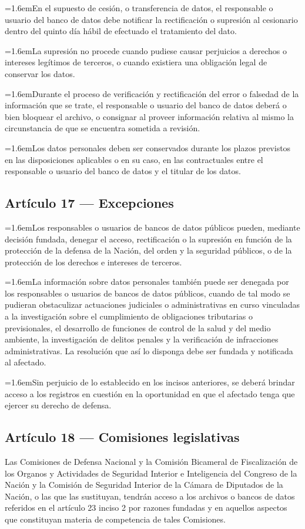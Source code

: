 \documentclass[10pt,a4paper]{article}
\newcommand{\articulo}[1]{\subsection{#1}}
\newcommand{\inciso}[2]{\par{\hangindent=1.6em\hangafter=1\makebox[1.6em][l]{#1}#2\par}}
\begin{document}
\inciso{4.}{En el supuesto de cesión, o transferencia de datos, el responsable o usuario del banco de datos debe notificar la rectificación o supresión al cesionario dentro del quinto día hábil de efectuado el tratamiento del dato.}

\inciso{5.}{La supresión no procede cuando pudiese causar perjuicios a derechos o intereses legítimos de terceros, o cuando existiera una obligación legal de conservar los datos.}

\inciso{6.}{Durante el proceso de verificación y rectificación del error o falsedad de la información que se trate, el responsable o usuario del banco de datos deberá o bien bloquear el archivo, o consignar al proveer información relativa al mismo la circunstancia de que se encuentra sometida a revisión.}

\inciso{7.}{Los datos personales deben ser conservados durante los plazos previstos en las disposiciones aplicables o en su caso, en las contractuales entre el responsable o usuario del banco de datos y el titular de los datos.}

\articulo{Artículo 17 --- Excepciones}
\inciso{1.}{Los responsables o usuarios de bancos de datos públicos pueden, mediante decisión fundada, denegar el acceso, rectificación o la supresión en función de la protección de la defensa de la Nación, del orden y la seguridad públicos, o de la protección de los derechos e intereses de terceros.}

\inciso{2.}{La información sobre datos personales también puede ser denegada por los responsables o usuarios de bancos de datos públicos, cuando de tal modo se pudieran obstaculizar actuaciones judiciales o administrativas en curso vinculadas a la investigación sobre el cumplimiento de obligaciones tributarias o previsionales, el desarrollo de funciones de control de la salud y del medio ambiente, la investigación de delitos penales y la verificación de infracciones administrativas. La resolución que así lo disponga debe ser fundada y notificada al afectado.}

\inciso{3.}{Sin perjuicio de lo establecido en los incisos anteriores, se deberá brindar acceso a los registros en cuestión en la oportunidad en que el afectado tenga que ejercer su derecho de defensa.}

\articulo{Artículo 18 --- Comisiones legislativas}
Las Comisiones de Defensa Nacional y la Comisión Bicameral de Fiscalización de los Organos y Actividades de Seguridad Interior e Inteligencia del Congreso de la Nación y la Comisión de Seguridad Interior de la Cámara de Diputados de la Nación, o las que las sustituyan, tendrán acceso a los archivos o bancos de datos referidos en el artículo 23 inciso 2 por razones fundadas y en aquellos aspectos que constituyan materia de competencia de tales Comisiones.
\end{document}
